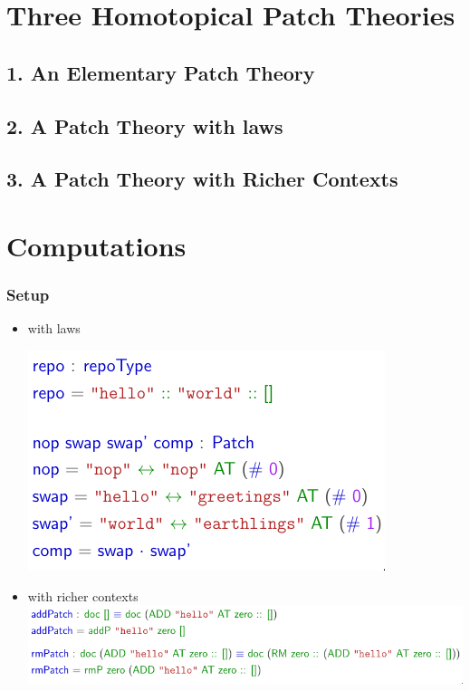 \documentclass{beamer}
\begin{document}
\section{Three Homotopical Patch Theories}

\subsection{1. An Elementary Patch Theory}


\subsection{2. A Patch Theory with laws}


\subsection{3. A Patch Theory with Richer Contexts}


\section{Computations}

\begin{frame}
  \frametitle{Setup}
  \begin{itemize}
  \item with laws
    
    \includegraphics[width=.6\textwidth]{figures/laws-setup}
  \item with richer contexts
    \includegraphics[width=\textwidth]{figures/richer-setup}
  \end{itemize}
\end{frame}
\end{document}
